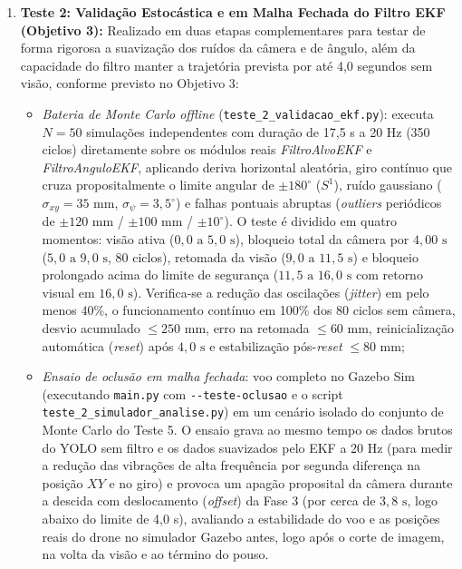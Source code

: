 \begin{enumerate}
	\item \textbf{Teste 2: Validação Estocástica e em Malha Fechada do Filtro EKF (Objetivo 3):} Realizado em duas etapas complementares para testar de forma rigorosa a suavização dos ruídos da câmera e de ângulo, além da capacidade do filtro manter a trajetória prevista por até 4,0 segundos sem visão, conforme previsto no Objetivo 3:
	\begin{itemize}
		\item \textit{Bateria de Monte Carlo offline} (\texttt{teste\_2\_\allowbreak validacao\_\allowbreak ekf.py}): executa $N = 50$ simulações independentes com duração de 17,5 s a 20 Hz (350 ciclos) diretamente sobre os módulos reais \textit{FiltroAlvoEKF} e \textit{FiltroAnguloEKF}, aplicando deriva horizontal aleatória, giro contínuo que cruza propositalmente o limite angular de $\pm 180^\circ$ ($S^1$), ruído gaussiano ($\sigma_{xy} = 35\text{ mm}$, $\sigma_\psi = 3,5^\circ$) e falhas pontuais abruptas (\textit{outliers} periódicos de $\pm 120\text{ mm}$ / $\pm 100\text{ mm}$ / $\pm 10^\circ$). O teste é dividido em quatro momentos: visão ativa ($0,0\text{ a } 5,0\text{ s}$), bloqueio total da câmera por $4,00\text{ s}$ ($5,0\text{ a } 9,0\text{ s}$, 80 ciclos), retomada da visão ($9,0\text{ a } 11,5\text{ s}$) e bloqueio prolongado acima do limite de segurança ($11,5\text{ a } 16,0\text{ s}$ com retorno visual em $16,0\text{ s}$). Verifica-se a redução das oscilações (\textit{jitter}) em pelo menos $40\%$, o funcionamento contínuo em 100\% dos 80 ciclos sem câmera, desvio acumulado $\le 250\text{ mm}$, erro na retomada $\le 60\text{ mm}$, reinicialização automática (\textit{reset}) após $4,0\text{ s}$ e estabilização pós-\textit{reset} $\le 80\text{ mm}$;
		\item \textit{Ensaio de oclusão em malha fechada}: voo completo no Gazebo Sim (executando \texttt{main.py} com \texttt{-{}-teste-\allowbreak oclusao} e o script \texttt{teste\_2\_\allowbreak simulador\_\allowbreak analise.py}) em um cenário isolado do conjunto de Monte Carlo do Teste 5. O ensaio grava ao mesmo tempo os dados brutos do YOLO sem filtro e os dados suavizados pelo EKF a 20 Hz (para medir a redução das vibrações de alta frequência por segunda diferença na posição $XY$ e no giro) e provoca um apagão proposital da câmera durante a descida com deslocamento (\textit{offset}) da Fase 3 (por cerca de $3,8\text{ s}$, logo abaixo do limite de 4,0 s), avaliando a estabilidade do voo e as posições reais do drone no simulador Gazebo antes, logo após o corte de imagem, na volta da visão e ao término do pouso.
	\end{itemize}
	

\end{enumerate}
